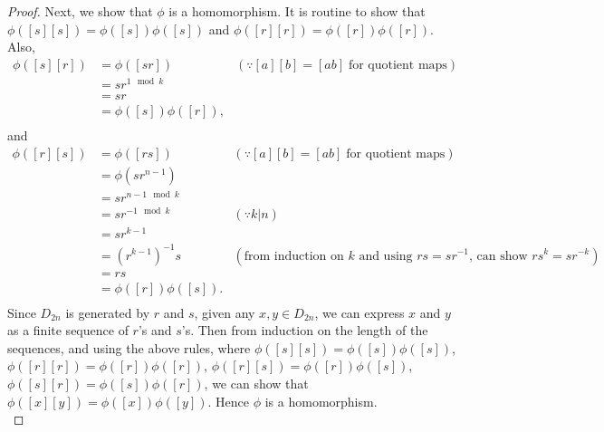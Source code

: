 \documentclass{article}
\begin{document}
\begin{enumerate}
\begin{enumerate}
\begin{enumerate}
\begin{proof}
              Next, we show that $\phi$ is a homomorphism. It is routine to
              show that $\phi([s][s])=\phi([s])\phi([s])$ and
              $\phi([r][r])=\phi([r])\phi([r])$. Also,
              \begin{align*}
                \phi([s][r])  &= \phi([sr])           & (\because
                [a][b]=[ab]\; \text{for quotient maps})\\
                              &= sr^{1\mod{k}}        & \\
                              &= sr                   & \\
                              &= \phi([s])\phi([r]),  & \\
              \end{align*}
              and
              \begin{align*}
                \phi([r][s])  &= \phi([rs])       & (\because [a][b]=[ab]\;
                \text{for quotient maps}) \\
                              &= \phi(sr^{n-1})   & \\
                              &= sr^{n-1\mod{k}}  & \\
                              &= sr^{-1\mod{k}}   & (\because k|n) \\
                              &= sr^{k-1}         & \\
                              &= (r^{k-1})^{-1}s  & (\text{from induction on
                              $k$ and using $rs=sr^{-1}$, can show
                              $rs^k=sr^{-k}$}) \\
                              &= rs               & \\
                              &= \phi([r])\phi([s]).  \\
              \end{align*}
              Since $D_{2n}$ is generated by $r$ and $s$, given any
              $x,y\in D_{2n}$, we can express $x$ and $y$ as a finite
              sequence of $r$'s and $s$'s. Then from induction on the
              length of the sequences, and using the above rules, where
              $\phi([s][s])=\phi([s])\phi([s])$,
              $\phi([r][r])=\phi([r])\phi([r])$,
              $\phi([r][s])=\phi([r])\phi([s])$,
              $\phi([s][r])=\phi([s])\phi([r])$, we can
              show that $\phi([x][y])=\phi([x])\phi([y])$. Hence $\phi$ is
              a homomorphism. \\


\end{proof}
\end{enumerate}
\end{enumerate}
\end{enumerate}
\end{document}
